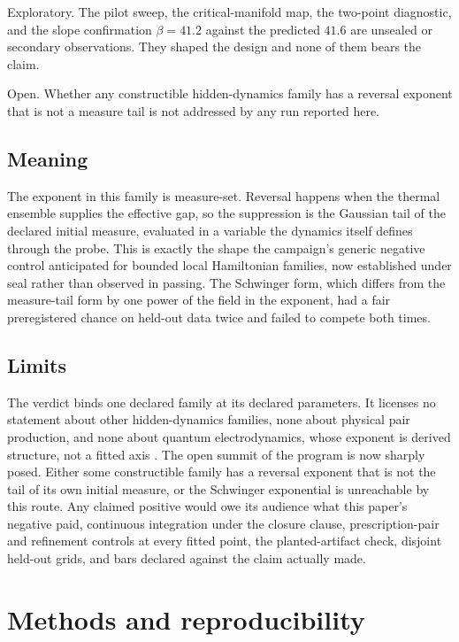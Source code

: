 \documentclass[aps,prd,reprint,nofootinbib,longbibliography]{revtex4-2}
\begin{document}
Exploratory.  The pilot sweep, the critical-manifold map, the two-point
diagnostic, and the slope confirmation $\beta = 41.2$ against the
predicted $41.6$ are unsealed or secondary observations.  They shaped
the design and none of them bears the claim.

Open.  Whether any constructible hidden-dynamics family has a reversal
exponent that is not a measure tail is not addressed by any run reported
here.

\subsection{Meaning}

The exponent in this family is measure-set.  Reversal happens when the
thermal ensemble supplies the effective gap, so the suppression is the
Gaussian tail of the declared initial measure, evaluated in a variable
the dynamics itself defines through the probe.  This is exactly the
shape the campaign's generic negative control anticipated for bounded
local Hamiltonian families, now established under seal rather than
observed in passing.  The Schwinger form, which differs from the
measure-tail form by one power of the field in the exponent, had a fair
preregistered chance on held-out data twice and failed to compete both
times.

\subsection{Limits}

The verdict binds one declared family at its declared parameters.  It
licenses no statement about other hidden-dynamics families, none about
physical pair production, and none about quantum electrodynamics, whose
exponent is derived structure, not a fitted axis
\cite{Schwinger1951, Dunne2004}.  The open summit of the program is now
sharply posed.  Either some constructible family has a reversal exponent
that is not the tail of its own initial measure, or the Schwinger
exponential is unreachable by this route.  Any claimed positive would
owe its audience what this paper's negative paid, continuous integration
under the closure clause, prescription-pair and refinement controls at
every fitted point, the planted-artifact check, disjoint held-out grids,
and bars declared against the claim actually made.

\section{Methods and reproducibility}
\label{sec:methods}
\end{document}
